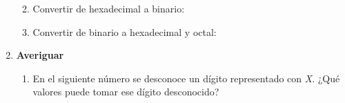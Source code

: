 \documentclass[12pt]{article}
\begin{document}
\begin{enumerate}
\begin{enumerate}
\begin{enumerate*}[itemjoin=\hspace{2em}]
        \end{enumerate*}

        \item Convertir de hexadecimal a binario:


        \item Convertir de binario a hexadecimal y octal:


    \end{enumerate}

    \item \textbf{Averiguar}

    \begin{enumerate}

        \item En el siguiente número se desconoce un dígito representado con
            \emph{X}. ¿Qué valores puede tomar ese dígito desconocido?

\end{enumerate}
\end{enumerate}
\end{document}
